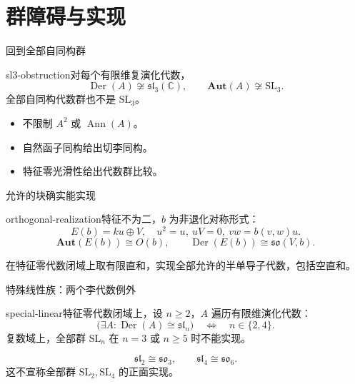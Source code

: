 \documentclass{beamer}
\begin{document}
\section{群障碍与实现}
\begin{frame}{回到全部自同构群}
\begin{bookresult}{sl3-obstruction}对每个有限维复演化代数，\[\operatorname{Der}(A)\not\cong\mathfrak{sl}_3(\mathbb C),\qquad\mathbf{Aut}(A)\not\cong\mathrm{SL}_3.\]全部自同构代数群也不是 $\mathrm{SL}_3$。\end{bookresult}\begin{itemize}\item 不限制 $A^2$ 或 $\operatorname{Ann}(A)$。\item 自然函子同构给出切李同构。\item 特征零光滑性给出代数群比较。\end{itemize}
\end{frame}
\begin{frame}{允许的块确实能实现}
\begin{bookresult}{orthogonal-realization}特征不为二，$b$ 为非退化对称形式：\[E(b)=ku\oplus V,\quad u^2=u,\ uV=0,\ vw=b(v,w)u.\]\[\mathbf{Aut}(E(b))\cong O(b),\qquad\operatorname{Der}(E(b))\cong\mathfrak{so}(V,b).\]\end{bookresult}在特征零代数闭域上取有限直和，实现全部允许的半单导子代数，包括空直和。
\end{frame}
\begin{frame}{特殊线性族：两个李代数例外}
\begin{bookresult}{special-linear}特征零代数闭域上，设 $n\ge2$，$A$ 遍历有限维演化代数：\[\bigl(\exists A:\operatorname{Der}(A)\cong\mathfrak{sl}_n\bigr)\quad\Longleftrightarrow\quad n\in\{2,4\}.\]复数域上，全部群 $\mathrm{SL}_n$ 在 $n=3$ 或 $n\ge5$ 时不能实现。\end{bookresult}\[\mathfrak{sl}_2\cong\mathfrak{so}_3,\qquad\mathfrak{sl}_4\cong\mathfrak{so}_6.\]这不宣称全部群 $\mathrm{SL}_2,\mathrm{SL}_4$ 的正面实现。
\end{frame}
\end{document}
